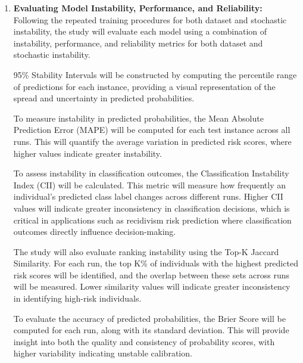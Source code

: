 \documentclass[12pt]{article}
\begin{document}
\begin{enumerate}
  Similar to the dataset instability procedure, all predictions will be stored in structured CSV files, where each column will correspond to a specific training run with a distinct random seed. This format will enable direct comparison of predictions across runs at the individual level.\\

  By repeating this process across multiple random seeds, the study will generate a distribution of predictions for each test instance under stochastic conditions. These distributions will then be used in the later stages of the methodology.

  \item \textbf{Evaluating Model Instability, Performance, and Reliability:}
  Following the repeated training procedures for both dataset and stochastic instability, the study will evaluate each model using a combination of instability, performance, and reliability metrics for both dataset and stochastic instability.

  95\% Stability Intervals will be constructed by computing the percentile range of predictions for each instance, providing a visual representation of the spread and uncertainty in predicted probabilities.

  To measure instability in predicted probabilities, the Mean Absolute Prediction Error (MAPE) will be computed for each test instance across all runs. This will quantify the average variation in predicted risk scores, where higher values indicate greater instability. 

  To assess instability in classification outcomes, the Classification Instability Index (CII) will be calculated. This metric will measure how frequently an individual's predicted class label changes across different runs. Higher CII values will indicate greater inconsistency in classification decisions, which is critical in applications such as recidivism risk prediction where classification outcomes directly influence decision-making.  

  The study will also evaluate ranking instability using the Top-K Jaccard Similarity. For each run, the top K\% of individuals with the highest predicted risk scores will be identified, and the overlap between these sets across runs will be measured. Lower similarity values will indicate greater inconsistency in identifying high-risk individuals.

  To evaluate the accuracy of predicted probabilities, the Brier Score will be computed for each run, along with its standard deviation. This will provide insight into both the quality and consistency of probability scores, with higher variability indicating unstable calibration.


\end{enumerate}
\end{document}

